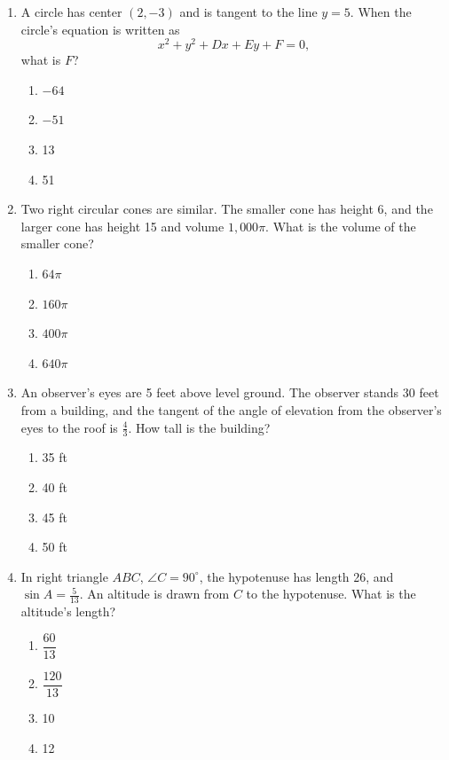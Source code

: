 \documentclass[12pt]{article}
\begin{document}
\begin{enumerate}[leftmargin=*,itemsep=1.15em]
  \item A circle has center $(2,-3)$ and is tangent to the line $y=5$. When the circle's equation is written as
  \[
    x^2+y^2+Dx+Ey+F=0,
  \]
  what is $F$?
  \begin{enumerate}[label=\Alph*.,itemsep=0pt]
    \item $-64$ \item $-51$ \item 13 \item 51
  \end{enumerate}

  \item Two right circular cones are similar. The smaller cone has height 6, and the larger cone has height 15 and volume $1,000\pi$. What is the volume of the smaller cone?
  \begin{enumerate}[label=\Alph*.,itemsep=0pt]
    \item $64\pi$ \item $160\pi$ \item $400\pi$ \item $640\pi$
  \end{enumerate}

  \item An observer's eyes are 5 feet above level ground. The observer stands 30 feet from a building, and the tangent of the angle of elevation from the observer's eyes to the roof is $\frac43$. How tall is the building?
  \begin{enumerate}[label=\Alph*.,itemsep=0pt]
    \item 35 ft \item 40 ft \item 45 ft \item 50 ft
  \end{enumerate}

  \item In right triangle $ABC$, $\angle C=90^\circ$, the hypotenuse has length 26, and $\sin A=\frac5{13}$. An altitude is drawn from $C$ to the hypotenuse. What is the altitude's length?
  \begin{enumerate}[label=\Alph*.,itemsep=0pt]
    \item $\dfrac{60}{13}$ \item $\dfrac{120}{13}$
    \item 10 \item 12
  \end{enumerate}
\end{enumerate}
\end{document}
